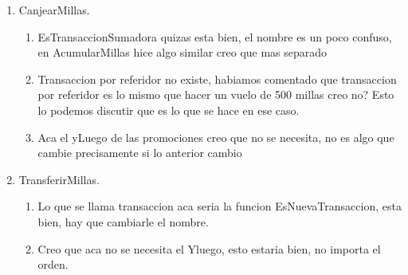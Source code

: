 \documentclass[11pt,a4paper]{article}
\begin{document}
\begin{enumerate}
\begin{enumerate}
			\item en los "atributos" de las promociones se acceden como si fuera un struct pero es una tuple¿?
			\item pq el millasrestantes agarra  parametros en calcular millas, aunque se acabe la promociones se desea que consiga las misma millas que como si tuviera toda la promocion, pq es lo que hace creo
		      \item Consultar que se hace cuando las millas restantes de la promocion son menores que la distancia. (La decision tomada fue no hacer nada, consultar resolucion) \textbf{Revisado}.
		      \item Consultar los entoncesluego y los yluego
		      \item Consultar para las funciones EsVuelo, EsTransferencia, EsTransferenciaEnviada, principalmente si tengo que verificar todos los campos de antes o no (actualizacion creo que no porque es un pred?)
		      \item Consultar anidacion de ifthenelse que en el grupo hablaron que era medio dudoso. Para mi era valido
		      \item Consultar que pasa si la categoria es platino. Deberia estar como condicion en el requiere? Creo que si eso no esta entonces se registrarian transacciones con valor 0?
	      \end{enumerate}
	\item CanjearMillas.
	      \begin{enumerate}
		      \item EsTransaccionSumadora quizas esta bien, el nombre es un poco confuso, en AcumularMillas hice algo similar creo que mas separado
		      \item Transaccion por referidor no existe, habiamos comentado que transaccion por referidor es lo mismo que hacer un vuelo de 500 millas creo no? Esto lo podemos discutir que es lo que se hace en ese caso.
		      \item Aca el yLuego de las promociones creo que no se necesita, no es algo que cambie precisamente si lo anterior cambio
	      \end{enumerate}
	\item TransferirMillas.
	      \begin{enumerate}
		      \item Lo que se llama transaccion aca seria la funcion EsNuevaTransaccion, esta bien, hay que cambiarle el nombre.
		      \item Creo que aca no se necesita el Yluego, esto estaria bien, no importa el orden.

\end{enumerate}
\end{enumerate}
\end{document}
